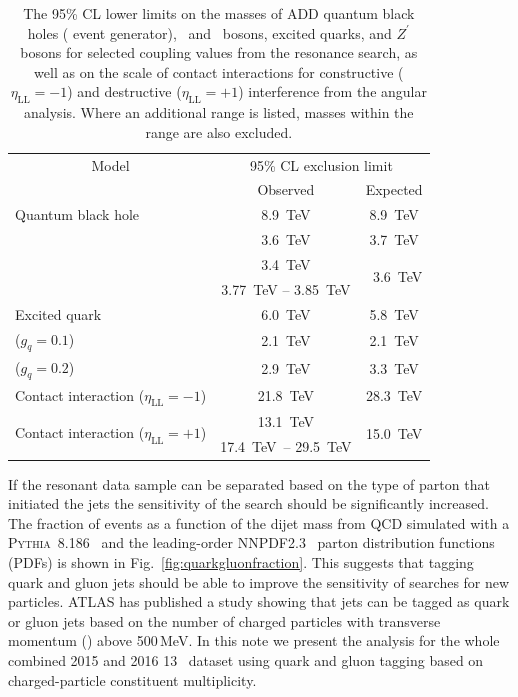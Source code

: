 \begin{table}[!h]
	\centering
	\caption{The 95\% CL lower limits on the masses of ADD quantum black holes (\textsc{\BlackMax} event generator), \Wprime\ and \Wstar\ bosons, excited quarks, and $Z^\prime$ bosons for selected coupling values from the resonance search, as well as on the scale of contact interactions for constructive ($\eta_{\text{LL}}=-1$) and destructive ($\eta_{\text{LL}}=+1$) interference from the angular analysis. Where an additional range is listed, masses within the range are also excluded.}
	\begin{tabular}{ l c c}
		\toprule
		\multicolumn{1}{c}{Model} & \multicolumn{2}{c}{95\% CL exclusion limit} \\
		\cmidrule(r){2-3}
		&  Observed & Expected \\
		\midrule
		Quantum black hole &  8.9~TeV\xspace  & 8.9~TeV\xspace \\
		\midrule
		\Wprime  & 3.6~TeV\xspace &   3.7~TeV\xspace \\
		\midrule
		\multirow{2}{*}{\Wstar}  & 3.4~TeV\xspace  &    \multirow{2}{*}{~3.6~TeV\xspace}  \\
		&3.77~TeV -- 3.85~TeV & \\		
		\midrule
		Excited quark & 6.0~TeV\xspace  &   5.8~TeV\xspace  \\
		\midrule
		\Zprime ($g_q= 0.1$)  & 2.1~TeV\xspace & 2.1~TeV\xspace \\
		\midrule
		\Zprime ($g_q= 0.2$)  & 2.9~TeV\xspace & 3.3~TeV\xspace \\
		\midrule                                               
		Contact interaction ($\eta_{\text{LL}}= -1$) & 21.8~TeV\xspace\phantom{.} & 28.3~TeV\xspace\phantom{.} \\
		\midrule
		\multirow{2}{*}{Contact interaction ($\eta_{\text{LL}}= +1$)}  & 13.1~TeV\xspace\phantom{.} & \multirow{2}{*}{15.0~TeV\xspace\phantom{.}} \\
		& 17.4~TeV\xspace\ -- 29.5~TeV\xspace & \\
		\bottomrule
	\end{tabular}
	\label{tab:Limits201516}
\end{table}


If the resonant data sample can be separated  based on the type of  parton that initiated the jets the 
sensitivity of the search should be significantly increased. The fraction of events as a function of 
the dijet mass from QCD  simulated with a  \textsc{Pythia~8.186}~\cite{pythia8} and the leading-order NNPDF2.3~\cite{Ball:2012cx} parton distribution functions (PDFs) is shown in Fig.~\ref{fig:quarkgluonfraction}. 
This suggests that tagging quark and gluon jets should be able to improve the sensitivity of searches for new particles. 
ATLAS has 
published a study \cite{ATL-PHYS-PUB-2017-009} showing that jets can be tagged as quark or gluon jets 
based on the number of charged particles with transverse momentum (\pt ) above 500\,MeV. 
In this note we present the analysis for the whole combined 2015 and 2016 13~\TeV\xspace dataset using quark 
and gluon tagging  based on charged-particle constituent multiplicity.

